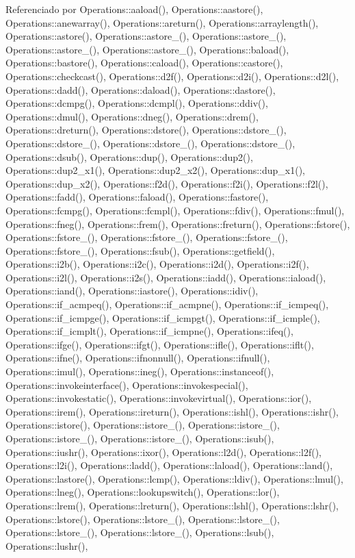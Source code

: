 Referenciado por Operations\+::aaload(), Operations\+::aastore(), Operations\+::anewarray(), Operations\+::areturn(), Operations\+::arraylength(), Operations\+::astore(), Operations\+::astore\+\_(), Operations\+::astore\+\_(), Operations\+::astore\+\_(), Operations\+::astore\+\_(), Operations\+::baload(), Operations\+::bastore(), Operations\+::caload(), Operations\+::castore(), Operations\+::checkcast(), Operations\+::d2f(), Operations\+::d2i(), Operations\+::d2l(), Operations\+::dadd(), Operations\+::daload(), Operations\+::dastore(), Operations\+::dcmpg(), Operations\+::dcmpl(), Operations\+::ddiv(), Operations\+::dmul(), Operations\+::dneg(), Operations\+::drem(), Operations\+::dreturn(), Operations\+::dstore(), Operations\+::dstore\+\_(), Operations\+::dstore\+\_(), Operations\+::dstore\+\_(), Operations\+::dstore\+\_(), Operations\+::dsub(), Operations\+::dup(), Operations\+::dup2(), Operations\+::dup2\+\_\+x1(), Operations\+::dup2\+\_\+x2(), Operations\+::dup\+\_\+x1(), Operations\+::dup\+\_\+x2(), Operations\+::f2d(), Operations\+::f2i(), Operations\+::f2l(), Operations\+::fadd(), Operations\+::faload(), Operations\+::fastore(), Operations\+::fcmpg(), Operations\+::fcmpl(), Operations\+::fdiv(), Operations\+::fmul(), Operations\+::fneg(), Operations\+::frem(), Operations\+::freturn(), Operations\+::fstore(), Operations\+::fstore\+\_(), Operations\+::fstore\+\_(), Operations\+::fstore\+\_(), Operations\+::fstore\+\_(), Operations\+::fsub(), Operations\+::getfield(), Operations\+::i2b(), Operations\+::i2c(), Operations\+::i2d(), Operations\+::i2f(), Operations\+::i2l(), Operations\+::i2s(), Operations\+::iadd(), Operations\+::iaload(), Operations\+::iand(), Operations\+::iastore(), Operations\+::idiv(), Operations\+::if\+\_\+acmpeq(), Operations\+::if\+\_\+acmpne(), Operations\+::if\+\_\+icmpeq(), Operations\+::if\+\_\+icmpge(), Operations\+::if\+\_\+icmpgt(), Operations\+::if\+\_\+icmple(), Operations\+::if\+\_\+icmplt(), Operations\+::if\+\_\+icmpne(), Operations\+::ifeq(), Operations\+::ifge(), Operations\+::ifgt(), Operations\+::ifle(), Operations\+::iflt(), Operations\+::ifne(), Operations\+::ifnonnull(), Operations\+::ifnull(), Operations\+::imul(), Operations\+::ineg(), Operations\+::instanceof(), Operations\+::invokeinterface(), Operations\+::invokespecial(), Operations\+::invokestatic(), Operations\+::invokevirtual(), Operations\+::ior(), Operations\+::irem(), Operations\+::ireturn(), Operations\+::ishl(), Operations\+::ishr(), Operations\+::istore(), Operations\+::istore\+\_(), Operations\+::istore\+\_(), Operations\+::istore\+\_(), Operations\+::istore\+\_(), Operations\+::isub(), Operations\+::iushr(), Operations\+::ixor(), Operations\+::l2d(), Operations\+::l2f(), Operations\+::l2i(), Operations\+::ladd(), Operations\+::laload(), Operations\+::land(), Operations\+::lastore(), Operations\+::lcmp(), Operations\+::ldiv(), Operations\+::lmul(), Operations\+::lneg(), Operations\+::lookupswitch(), Operations\+::lor(), Operations\+::lrem(), Operations\+::lreturn(), Operations\+::lshl(), Operations\+::lshr(), Operations\+::lstore(), Operations\+::lstore\+\_(), Operations\+::lstore\+\_(), Operations\+::lstore\+\_(), Operations\+::lstore\+\_(), Operations\+::lsub(), Operations\+::lushr(), 